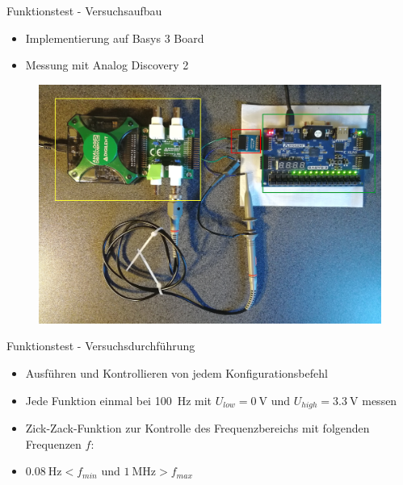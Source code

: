 \documentclass[11pt]{beamer}
\begin{document}
\begin{frame}{Funktionstest - Versuchsaufbau}
  \begin{itemize}
    \item Implementierung auf Basys 3 Board
    \item Messung mit Analog Discovery 2
  \end{itemize}
  \begin{figure}
    \includegraphics[scale=0.15]{testaufbau_annotated_fg}
  \end{figure}
\end{frame}

\begin{frame}{Funktionstest - Versuchsdurchführung}
  \begin{itemize}
  \item Ausführen und Kontrollieren von jedem Konfigurationsbefehl
  \item Jede Funktion einmal bei \SI{100}{\hertz} mit $U_{low} = \SI{0}{\volt}$ und $U_{high} = \SI{3.3}{\volt}$ messen
  \item Zick-Zack-Funktion zur Kontrolle des Frequenzbereichs mit folgenden Frequenzen $f$:
    \begin{table}
    \end{table}
  \item $\SI{0.08}{\hertz} < f_{min}$ und $\SI{1}{\mega\hertz} > f_{max}$
  \end{itemize}

\end{frame}
\end{document}
